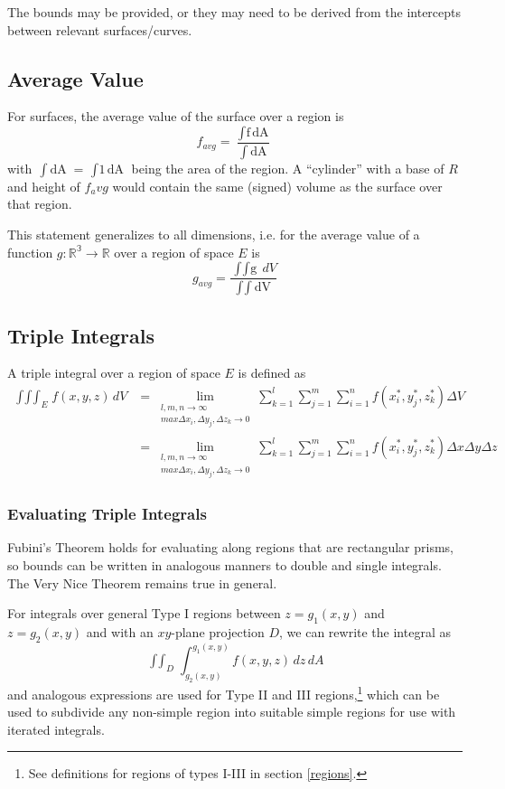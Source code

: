 \documentclass{article}
\begin{document}
The bounds may be provided, or they may need to be derived from the intercepts between relevant surfaces/curves.

\subsection{Average Value}
For surfaces, the average value of the surface over a region is
$$f_{avg}=\frac{\mathop{\int\int_Rf\,dA}}{\mathop{\int\int_R\,dA}}$$
with $\mathop{\int\int_R\,dA}=\mathop{\int\int_R1\,dA}$ being the area of the region.
A ``cylinder'' with a base of $R$ and height of $f_avg$ would contain the same (signed) volume as the surface over that region.

This statement generalizes to all dimensions, i.e. for the average value of a function $g: \mathbb{R^3}\to\mathbb{R}$ over a region of space $E$ is
$$g_{avg}=\frac{\mathop{\int\int\int_E g(x,y,z)}\,dV}{\mathop{\int\int\int_E\,dV}}$$

\subsection{Triple Integrals}
A triple integral over a region of space $E$ is defined as
\begin{align*}
    \mathop{\int\int\int}_E f(x,y,z)\,dV
    &=\lim_{\substack{l,m,n\to\infty\\max\Delta{x_i},\Delta{y_j},\Delta{z_k}\to0}}\sum^l_{k=1}\sum^m_{j=1}\sum^n_{i=1}f(x_i^*,y_j^*,z_k^*) \Delta{V}\\
    &=\lim_{\substack{l,m,n\to\infty\\max\Delta{x_i},\Delta{y_j},\Delta{z_k}\to0}}\sum^l_{k=1}\sum^m_{j=1}\sum^n_{i=1}f(x_i^*,y_j^*,z_k^*) \Delta{x}\Delta{y}\Delta{z}
\end{align*}

\subsubsection{Evaluating Triple Integrals}
Fubini's Theorem holds for evaluating along regions that are rectangular prisms, so bounds can be written in analogous manners to double and single integrals. The Very Nice Theorem remains true in general.

For integrals over general Type I regions between $z=g_1(x,y)$ and $z=g_2(x,y)$ and with an $xy$-plane projection $D$, we can rewrite the integral as
$$\mathop{\int\int}_D\int^{g_1(x,y)}_{g_2(x,y)} f(x,y,z)\,dz\,dA$$
and analogous expressions are used for Type II and III regions,\footnote{See definitions for regions of types I-III in section \ref{regions}.} which can be used to subdivide any non-simple region into suitable simple regions for use with iterated integrals.
\end{document}
